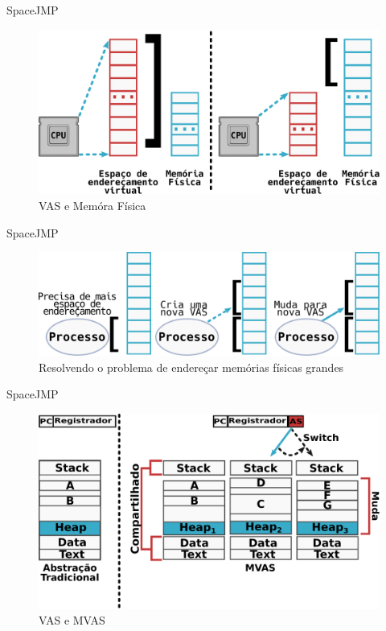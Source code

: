 \documentclass[xcolor={usenames,svgnames,dvipsnames},brazil,english,12pt,aspectratio=149]{beamer}
\begin{document}
\begin{frame}{SpaceJMP}
	\begin{figure}[!h]
		\centering
		\includegraphics[width=.7\textwidth]{vas_vs_physical_address} 
		\caption{VAS e Memóra Física}
		\label{fig:vas_vs_physical} 
	\end{figure}
\end{frame}

\begin{frame}{SpaceJMP}
	\begin{figure}[!h]
		\centering
		\includegraphics[width=.7\textwidth]{solve_huge_address_memory}
		\caption{Resolvendo o problema de endereçar memórias físicas grandes}
		\label{fig:large_memory}
	\end{figure}
\end{frame}

\begin{frame}{SpaceJMP}
	\begin{figure}[!h]
		\centering
		\includegraphics[width=.7\textwidth]{traditional_vs_mvas} 
		\caption{VAS e MVAS}
		\label{fig:traditional_vs_mvas} 
	\end{figure}
\end{frame}
\end{document}
